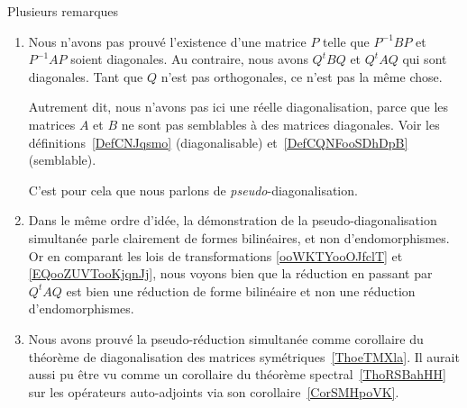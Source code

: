 \begin{remark}
    Plusieurs remarques
    \begin{enumerate}
        \item

            Nous n'avons pas prouvé l'existence d'une matrice \( P\) telle que \( P^{-1}BP\) et \( P^{-1}AP\) soient diagonales. Au contraire, nous avons \( Q^tBQ\) et \( Q^tAQ\) qui sont diagonales. Tant que \( Q\) n'est pas orthogonales, ce n'est pas la même chose.

            Autrement dit, nous n'avons pas ici une réelle diagonalisation, parce que les matrices \( A\) et \( B\) ne sont pas semblables à des matrices diagonales. Voir les définitions~\ref{DefCNJqsmo} (diagonalisable) et~\ref{DefCQNFooSDhDpB} (semblable).

            C'est pour cela que nous parlons de \emph{pseudo}-diagonalisation.

        \item

            Dans le même ordre d'idée, la démonstration de la pseudo-diagonalisation simultanée parle clairement de formes bilinéaires, et non d'endomorphismes. Or en comparant les lois de transformations \eqref{ooWKTYooOJfclT} et \eqref{EQooZUVTooKjqnJj}, nous voyons bien que la réduction en passant par \( Q^tAQ\) est bien une réduction de forme bilinéaire et non une réduction d'endomorphismes.

        \item

            Nous avons prouvé la pseudo-réduction simultanée comme corollaire du théorème de diagonalisation des matrices symétriques~\ref{ThoeTMXla}. Il aurait aussi pu être vu comme un corollaire du théorème spectral~\ref{ThoRSBahHH} sur les opérateurs auto-adjoints via son corollaire~\ref{CorSMHpoVK}.
    \end{enumerate}
\end{remark}
